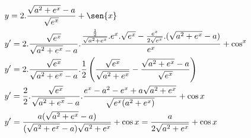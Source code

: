 \begin{ex}
\begin{align}
&y=2.\frac{\sqrt{a^2+e^x}-a}{\sqrt{e^x}}+\sen{x}\nonumber\\
&y'=2.\frac{\sqrt{e^x}}{\sqrt{a^2+e^x}-a}.\frac{\frac{\frac{1}{2}}{\sqrt{a^2+e^x}}.e^x.\sqrt{e^x}-\frac{e^x}{2\sqrt{e^x}}.(\sqrt{a^2+e^x}-a)}{e^x}+\cos^{x}\nonumber\\
&y'=2.\frac{\sqrt{e^x}}{\sqrt{a^2+e^x}-a}.\frac{1}{2}\left(\frac{\sqrt{e^x}}{\sqrt{a^2+e^x}}-\frac{\sqrt{a^2+e^x}-a}{\sqrt{e^x}}\right)\nonumber\\
&y'=\frac{2}{2}.\frac{\sqrt{e^x}}{\sqrt{a^2+e^x}-a}.\frac{e^x-a^2-e^x+a\sqrt{a^2+e^x}}{\sqrt{e^x(a^2+e^x)}}+\cos{x}\nonumber\\
&y'=\frac{a(\sqrt{a^2+e^x}-a)}{(\sqrt{a^2+e^x}-a)\sqrt{a^2+e^x}}+\cos{x}=\frac{a}{2\sqrt{a^2+e^x}}+\cos{x}\nonumber
\end{align}
\end{ex}